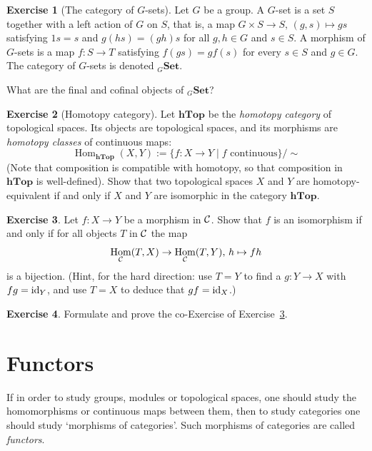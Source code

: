 \documentclass[11pt]{amsbook}
\DeclareMathOperator\Hom{Hom}
\def\id{{\rm id}}
\def\Set{\mathbf{Set}}
\def\hTop{\mathbf{hTop}}
\theoremstyle{plain}
\theoremstyle{definition}
\newtheorem{exercise}{Exercise}
\begin{document}
\begin{exercise}[The category of $G$-sets] Let $G$ be a group. A $G$-set is a set $S$ together with a left action of $G$ on $S$, that is, a map $G\times S \to S,\, (g,s)\mapsto gs$ satisfying $1s=s$ and $g(hs)=(gh)s$ for all $g,h \in G$ and $s\in S$. A morphism of $G$-sets is a map $f\colon S\to T$ satisfying $f(gs)=gf(s)$ for every $s\in S$ and $g\in G$. The category of $G$-sets is denoted $_{G}\Set$. 

What are the final and cofinal objects of $_{G}\Set$? 
\end{exercise}


\begin{exercise}[Homotopy category]
Let $\hTop$ be the \emph{homotopy category} of topological spaces. Its objects are 
topological spaces, and its morphisms are \emph{homotopy classes} of continuous maps:
\[
	\Hom_{\hTop}(X,Y) := \{ f\colon X\to Y \mid \text{$f$ continuous}\}/\sim
\]
(Note that composition is compatible with homotopy, so that composition in $\hTop$ is well-defined). Show that two topological spaces $X$ and $Y$ are homotopy-equivalent if and only if $X$ and $Y$ are isomorphic in the category $\hTop$. 
\end{exercise}

\begin{exercise}\label{exc:yoneda-isomorphism-test}
Let $f\colon X\to Y$ be a morphism in ${\mathcal{C}}$. Show that $f$ is an isomorphism if and only if for all objects $T$ in ${\mathcal{C}}$ the map
\[
	\Hom_\cC(T,X) \to \Hom_\cC(T,Y),\, h \mapsto fh
\]
is a bijection. (Hint, for the hard direction: use $T=Y$ to find a $g\colon Y\to X$ with $fg=\id_Y$, and use $T=X$ to deduce that $gf=\id_X$.)
\end{exercise}

\begin{exercise}Formulate and prove the co-Exercise of Exercise~\ref{exc:yoneda-isomorphism-test}.
\end{exercise}



\chapter{Functors}

If in order to study groups, modules or topological spaces, one should study the homomorphisms or continuous maps between them, then to study categories one should study `morphisms of categories'. Such morphisms of categories are called \emph{functors}. 
\end{document}
